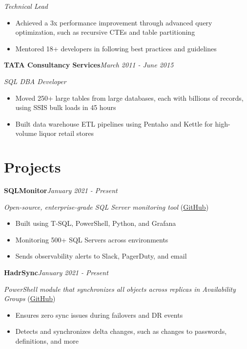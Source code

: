 \documentclass[10pt,a4paper]{article}
\begin{document}
\textit{Technical Lead}\\[-5pt]
\begin{itemize}
  \item Achieved a 3x performance improvement through advanced query optimization, such as recursive CTEs and table partitioning
  \item Mentored 18+ developers in following best practices and guidelines
\end{itemize}
\vspace{14.7pt}
\noindent\textbf{TATA Consultancy Services}\hfill \textit{March 2011 - June 2015}

\textit{SQL DBA Developer}\\[-5pt]
\begin{itemize}
  \item Moved 250+ large tables from large databases, each with billions of records, using SSIS bulk loads in 45 hours
  \item Built data warehouse ETL pipelines using Pentaho and Kettle for high-volume liquor retail stores
\end{itemize}

\section{Projects}

\noindent\textbf{SQLMonitor}\hfill \textit{January 2021 - Present}

\textit{Open-source, enterprise-grade SQL Server monitoring tool} (\href{https://github.com/imajaydwivedi/SQLMonitor}{GitHub})
\begin{itemize}
  \item Built using T-SQL, PowerShell, Python, and Grafana
  \item Monitoring 500+ SQL Servers across environments
  \item Sends observability alerts to Slack, PagerDuty, and email
\end{itemize}
\vspace{14.7pt}
\noindent\textbf{HadrSync}\hfill \textit{January 2021 - Present}

\textit{PowerShell module that synchronizes all objects across replicas in Availability Groups} (\href{https://github.com/imajaydwivedi/HadrSync}{GitHub})
\begin{itemize}
  \item Ensures zero sync issues during failovers and DR events
  \item Detects and synchronizes delta changes, such as changes to passwords, definitions, and more
\end{itemize}
\end{document}
